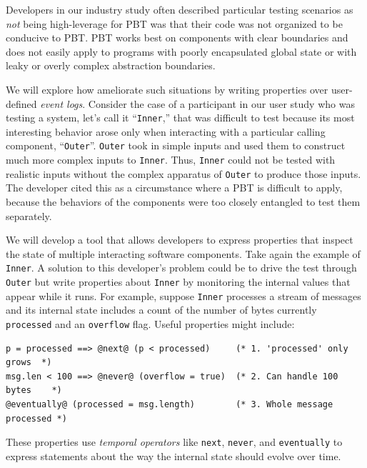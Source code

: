 
%
Developers in our industry study often described particular
testing scenarios as {\em not} being high-leverage for PBT was that
their code was not organized to be conducive to
PBT.  PBT works best on components with clear boundaries and does not
easily apply to programs with
poorly encapsulated global state or with leaky or overly complex abstraction
boundaries.

We will explore
how ameliorate such situations by writing properties over user-defined
{\em event logs}. Consider
the case of a participant in our user
study who was testing
a system, let's call it ``\lstinline{Inner},'' that  was difficult to
test because
its most interesting behavior arose only when interacting with a particular calling
component, ``\lstinline{Outer}''.
\lstinline{Outer} took in simple inputs and used them to construct
much more complex inputs to \lstinline{Inner}. Thus, \lstinline{Inner}
could not be tested with
realistic inputs without the complex apparatus of \lstinline{Outer} to
produce those inputs.  The developer cited this as a circumstance where a
PBT is difficult to apply, because the behaviors of the components were too
closely entangled to test them separately.

We will develop a tool that allows developers to express properties that inspect
the state of multiple interacting software components. Take again the example of
\lstinline{Inner}. A solution to this developer's problem could be to drive the
test through \lstinline{Outer} but write properties about
\lstinline{Inner} by monitoring the internal values that appear while it
runs. For example, suppose
\lstinline{Inner} processes a stream of messages and its internal state includes
a count of the number of bytes currently \lstinline{processed} and an
\lstinline{overflow} flag. Useful properties might  include:
\begin{lstlisting}
p = processed ==> @next@ (p < processed)     (* 1. 'processed' only grows  *)
msg.len < 100 ==> @never@ (overflow = true)  (* 2. Can handle 100 bytes    *)
@eventually@ (processed = msg.length)        (* 3. Whole message processed *)
\end{lstlisting}
These properties use {\em temporal operators} like \lstinline|next|,
\lstinline|never|, and \lstinline|eventually| to express statements about the
way the internal state should evolve over time.

